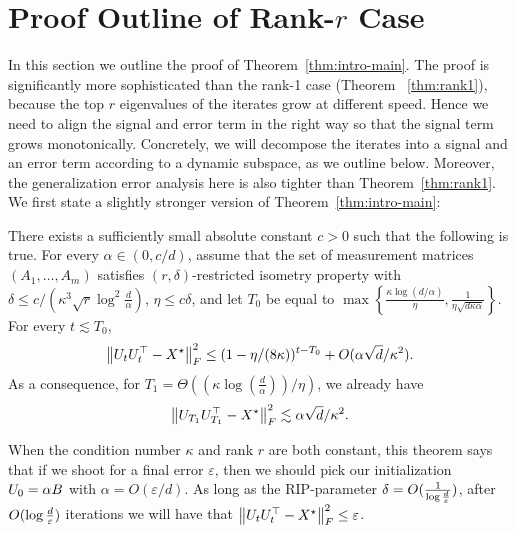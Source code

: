 \section{Proof Outline of Rank-$r$ Case}\label{sec:mainproof}

In this section we outline the proof of Theorem~\ref{thm:intro-main}. The proof is significantly more sophisticated than the rank-1 case (Theorem ~\ref{thm:rank1}), because the top $r$ eigenvalues of the iterates grow at different speed.
Hence we need to align the signal and error term in the right way so that the signal term grows monotonically.
Concretely, we will decompose the iterates into a signal and an error term according to a dynamic subspace, as we outline below. Moreover, the generalization error analysis here is also tighter than Theorem~\ref{thm:rank1}.  
We first state a slightly stronger version of Theorem~\ref{thm:intro-main}:

\begin{thm}\label{thm:technical-main}
	There exists a sufficiently small absolute constant $c > 0$ such that the following is true.
	For every $\alpha \in (0, c/d)$, assume that the set of measurement matrices $(A_1,\dots, A_m)$ satisfies $(r,\delta)$-restricted isometry property with $\delta \le c/(\kappa^3\sqrt{r} \log^2 \frac {d}{\alpha})$, $\eta \le c\delta$, and let $T_0$ be equal to $\max\left\{\frac{\kappa\log(d/\alpha)}{\eta}, \frac 1 {\eta \sqrt{d\kappa\alpha}}\right\}$.
	For every $t\lesssim T_0$,
	$$\left\|U_tU_t^\top-{X}^\star\right\|_F^2 \leq (1 - \eta /(8 \kappa))^{t - T_0} +O(\alpha \sqrt d / \kappa^2).$$
	As a consequence, for $T_1 =\Theta((\kappa\log (\frac d {\alpha}))/\eta)$, we already have
	\[ \left\|U_{T_1}U_{T_1}^\top-{X}^\star\right\|_F^2 \lesssim \alpha \sqrt d / \kappa^2. \]
\end{thm}

When the condition number $\kappa$ and rank $r$ are both constant,  this theorem says that if we shoot for a final error $\varepsilon$, then we should pick our initialization ${U}_0 = \alpha B$  with $\alpha = O(\varepsilon/d)$. As long as the RIP-parameter $\delta = O(\frac{1}{\log \frac{d}{\varepsilon}})$, after $O( \log \frac{d}{\varepsilon})$ iterations we will have that $\left\|U_tU_t^\top-{X}^\star\right\|_F^2 \leq \varepsilon$.


